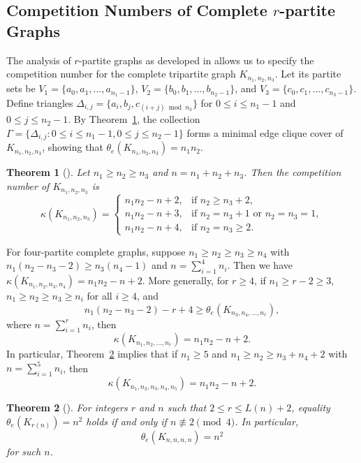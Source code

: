 \documentclass{article}
\newtheorem{theorem}{Theorem}[section]
\theoremstyle{definition}
\begin{document}
\subsection{Competition Numbers of Complete $r$-partite Graphs}
The analysis of $r$-partite graphs as developed in \cite{BJGJChangCAS,Balogh25Jiang} allows us to specify the competition number for the complete tripartite graph $K_{n_1,n_2,n_3}$. Let its partite sets be $V_1 = \{a_0, a_1, \ldots, a_{n_1 - 1}\}$, $V_2 = \{b_0, b_1, \ldots, b_{n_2 - 1}\}$, and $V_3 = \{c_0, c_1, \ldots, c_{n_3 - 1}\}$. Define triangles $\Delta_{i,j} = \{a_i, b_j, c_{(i+j) \bmod n_3}\}$ for $0 \leq i \leq n_1 - 1$ and $0 \leq j \leq n_2 - 1$. By Theorem~\ref{thm1Competition}, the collection $\Gamma = \{\Delta_{i,j} : 0 \leq i \leq n_1 - 1, 0 \leq j \leq n_2 - 1\}$ forms a minimal edge clique cover of $K_{n_1,n_2,n_3}$, showing that $\theta_e(K_{n_1,n_2,n_3}) = n_1 n_2$.

\begin{theorem}[{\cite{BJGJChangCAS}}]\label{thm1Competition}
Let $n_1 \geq n_2 \geq n_3$ and $n = n_1 + n_2 + n_3$. Then the competition number of $K_{n_1,n_2,n_3}$ is
\begin{equation}\label{eq1Competition}
\kappa(K_{n_1,n_2,n_3}) = \begin{cases}
n_1 n_2 - n + 2, & \text{if } n_2 \geq n_3 + 2, \\
n_1 n_2 - n + 3, & \text{if } n_2 = n_3 + 1 \text{ or } n_2 = n_3 = 1, \\
n_1 n_2 - n + 4, & \text{if } n_2 = n_3 \geq 2.
\end{cases}
\end{equation}
\end{theorem}

For four-partite complete graphs, suppose $n_1 \geq n_2 \geq n_3 \geq n_4$ with $n_1 (n_2 - n_3 - 2) \geq n_3 (n_4 - 1)$ and $n = \sum_{i=1}^4 n_i$. Then we have $\kappa(K_{n_1, n_2, n_3, n_4}) = n_1 n_2 - n + 2$. More generally, for $r \geq 4$, if $n_1 \geq r - 2 \geq 3$, $n_1 \geq n_2 \geq n_3 \geq n_i$ for all $i \geq 4$, and
\[
n_1 (n_2 - n_3 - 2) - r + 4 \geq \theta_e(K_{n_3, n_4, \ldots, n_r}),
\]
where $n = \sum_{i=1}^r n_i$, then
\[
\kappa(K_{n_1, n_2, \ldots, n_r}) = n_1 n_2 - n + 2.
\]
In particular, Theorem~\ref{thm2Competition} implies that if $n_1 \geq 5$ and $n_1 \geq n_2 \geq n_3 + n_4 + 2$ with $n = \sum_{i=1}^5 n_i$, then
\[
\kappa(K_{n_1, n_2, n_3, n_4, n_5}) = n_1 n_2 - n + 2.
\]

\begin{theorem}[{\cite{BJGJChangCAS}}]\label{thm2Competition}
For integers $r$ and $n$ such that $2 \leq r \leq L(n) + 2$, equality $\theta_e(K_{r(n)}) = n^2$ holds if and only if $n \not\equiv 2 \pmod{4}$. In particular,
\[
\theta_e(K_{n,n,n,n}) = n^2
\]
for such $n$.
\end{theorem}
\end{document}
